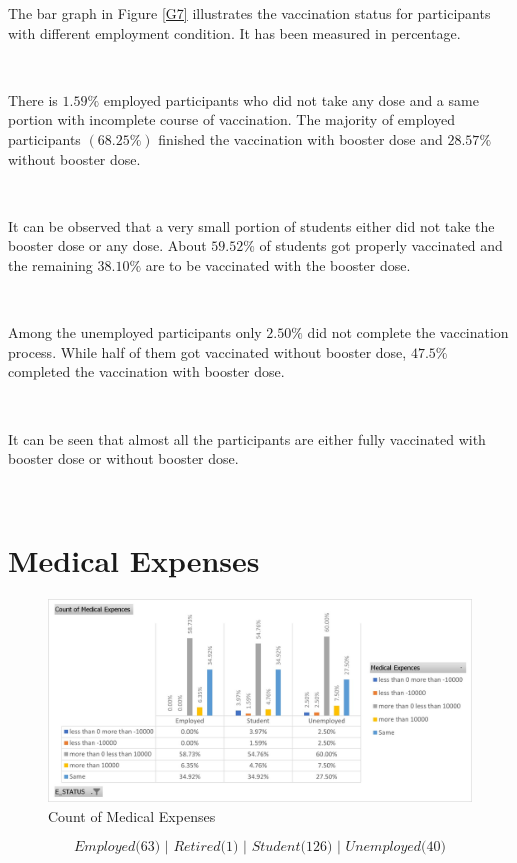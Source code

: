 The bar graph in Figure \ref{G7} illustrates the vaccination status for participants with different employment condition. It has been measured in percentage.

\ 

There is $1.59\%$ employed participants who did not take any dose and a same portion with incomplete course of vaccination.  The majority of employed participants $(68.25\%)$ finished the vaccination with booster dose and $28.57\%$ without booster dose.

\

It can be observed that a very small portion of students either did not take the booster dose or  any dose. About $59.52\%$ of students got properly vaccinated and the remaining $38.10\%$ are to be vaccinated with the booster dose.

\

Among the unemployed participants only $2.50\%$ did not complete the vaccination process. While half of them got vaccinated without booster dose, $47.5\%$ completed the vaccination with booster dose.

\

It can be seen that almost all the participants are either fully vaccinated with booster dose or without booster dose.

\

\newpage

\section{Medical Expenses}

\begin{figure}[h!]
	\centering
	\includegraphics[width=0.85\linewidth]{IMAGES/Image 8.jpg}
	\caption{Count of Medical Expenses}
	\label{G8}
\end{figure}
$$\textit{Employed($63$) | Retired($1$) | Student($126$) | Unemployed($40$)}$$

\ 

